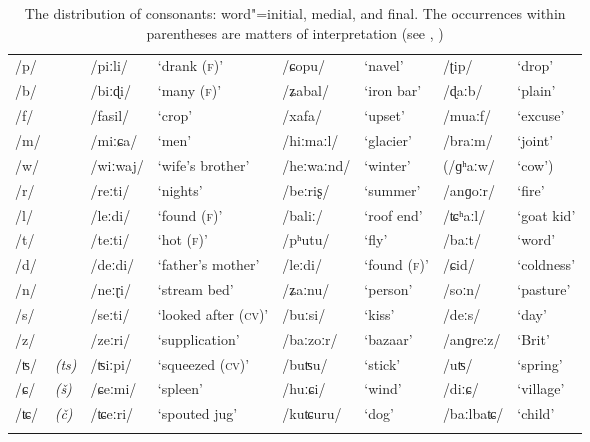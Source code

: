 \begin{sidewaystable}[p!]
\caption{The distribution of consonants: word"=initial, medial, and final.{\protect\footnotemark}
  The occurrences within parentheses are matters of interpretation (see ,
  )}
\begin{tabularx}{\textwidth}{ l@{\hspace{20pt}} l@{\hspace{20pt}} Q l@{\hspace{20pt}} Q Q Q Q }
\lsptoprule
/p/ &
&
/piːli/ &
`drank (\textsc{f)}' &
/ɕopu/ &
`navel' &
/ʈip/ &
`drop'\\
/b/ &
&
/biːɖi/ &
`many (\textsc{f)}' &
/ʑabal/ &
`iron bar' &
/ɖaːb/ &
`plain'\\
/f/ &
&
/fasil/ &
`crop' &
/xafa/ &
`upset' &
/muaːf/ &
`excuse'\\
/m/ &
&
/miːɕa/ &
`men' &
/hiːmaːl/ &
`glacier' &
/braːm/ &
`joint'\\
/w/ &
&
/wiːwaj/ &
`wife's brother' &
/heːwaːnd/ &
`winter' &
(/ɡʰaːw/ &
`cow')\\
/r/ &
&
/reːti/ &
`nights' &
/beːriʂ/ &
`summer' &
/anɡoːr/ &
`fire'\\
/l/ &
&
/leːdi/ &
`found (\textsc{f)}' &
/baliː/ &
`roof end' &
/ʨʰaːl/ &
`goat kid'\\
/t/ &
&
/teːti/ &
`hot (\textsc{f)}' &
/pʰutu/ &
`fly' &
/baːt/ &
`word'\\
/d/ &
&
/deːdi/ &
`father's mother' &
/leːdi/ &
`found (\textsc{f)}' &
/ɕid/ &
`coldness'\\
/n/ &
&
/neːɽi/ &
`stream bed' &
/ʑaːnu/ &
`person' &
/soːn/ &
`pasture'\\
/s/ &
&
/seːti/ &
`looked after (\textsc{cv)}' &
/buːsi/ &
`kiss' &
/deːs/ &
`day'\\
/z/ &
&
/zeːri/ &
`supplication' &
/baːzoːr/ &
`bazaar' &
/anɡreːz/ &
`Brit'\\
/ʦ/ &
\textit{(ts)} &
/ʦiːpi/ &
`squeezed (\textsc{cv)}' &
/buʦu/ &
`stick' &
/uʦ/ &
`spring'\\
/ɕ/ &
\textit{(š)} &
/ɕeːmi/ &
`spleen' &
/huːɕi/ &
`wind' &
/diːɕ/ &
`village'\\
/ʨ/ &
\textit{(č)} &
/ʨeːri/ &
`spouted jug' &
/kuʨuru/ &
`dog' &
/baːlbaʨ/ &
`child'\\\lspbottomrule
\end{tabularx}
\end{sidewaystable}

